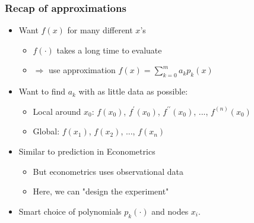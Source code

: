 \documentclass[bigger]{beamer}
\begin{document}
\begin{frame}%

\frametitle{Recap of approximations}

\begin{itemize}
\item Want $f\left( x\right) $ for many different $x$'s

\begin{itemize}
\item $f\left( \cdot \right) $ takes a long time to evaluate

\item $\Rightarrow $ use approximation $\hat{f}\left( x\right)
=\sum_{k=0}^{m}a_{k}p_{k}(x)$
\end{itemize}

\item Want to find $a_{k}$ with as little data as possible:

\begin{itemize}
\item Local around $x_{0}$: $f\left( x_{0}\right) $, $f^{\prime }\left(
x_{0}\right) $, $f^{\prime \prime }\left( x_{0}\right) $, ..., $f^{\left(
n\right) }\left( x_{0}\right) $

\item Global: $f\left( x_{1}\right) $, $f\left( x_{2}\right) $, ..., $%
f\left( x_{n}\right) $
\end{itemize}

\item Similar to prediction in Econometrics

\begin{itemize}
\item But econometrics uses observational data

\item Here, we can "design the experiment"
\end{itemize}

\item Smart choice of polynomials $p_{k}(\cdot )$ and nodes $x_{i}$.
\end{itemize}


\end{frame}%
\end{document}
